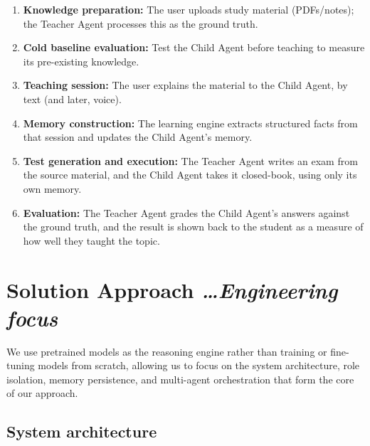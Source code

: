 \documentclass[11pt,a4paper]{article}
\newcommand{\mysection}[2]{%
    \section[#1]{#1 \hfill {\normalfont\itshape #2}}
}
\begin{document}
\begin{enumerate}

    \item \textbf{Knowledge preparation:} The user uploads study material (PDFs/notes); the Teacher Agent processes this as the ground truth.

    \item\textbf{Cold baseline evaluation:} Test the Child Agent before teaching to measure its pre-existing knowledge.

    \item \textbf{Teaching session:} The user explains the material to the Child Agent, by text (and later, voice).

    \item \textbf{Memory construction:} The learning engine extracts structured facts from that session and updates the Child Agent's memory.

    \item \textbf{Test generation and execution:} The Teacher Agent writes an exam from the source material, and the Child Agent takes it closed-book, using only its own memory.

    \item \textbf{Evaluation:} The Teacher Agent grades the Child Agent's answers against the ground truth, and the result is shown back to the student as a measure of how well they taught the topic.

\end{enumerate}


\mysection{Solution Approach}{\ldots Engineering focus}

We use pretrained models as the reasoning engine rather than training or fine-tuning models from scratch, allowing us to focus on the system architecture, role isolation, memory persistence, and multi-agent orchestration that form the core of our approach.


\subsection{System architecture}
\end{document}
